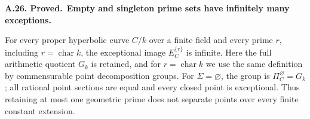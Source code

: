 \documentclass[11pt,a4paper]{article}
\newenvironment{claim}[3]{\par\medskip\noindent\hypertarget{#1}{\textbf{#1. #2.}}\ \textbf{#3.}\par\nopagebreak\smallskip\begingroup\itshape}{\endgroup\par\smallskip}
\begin{document}
\begin{claim}{A.26}{Proved}{Empty and singleton prime sets have infinitely many exceptions}

For every proper hyperbolic curve $C/k$ over a finite field and every
prime $r$, including $r=\operatorname{char}k$, the exceptional
image $E_C^{\{r\}}$ is infinite. Here the full arithmetic quotient
$G_k$ is retained, and for $r=\operatorname{char}k$ we use the
same definition by commensurable point decomposition groups.
For $\Sigma=\varnothing$, the group is $\Pi_C^\varnothing=G_k$;
all rational point sections are equal and every closed point is
exceptional. Thus retaining at most one geometric prime does not
separate points over every finite constant extension.

\end{claim}
\end{document}
